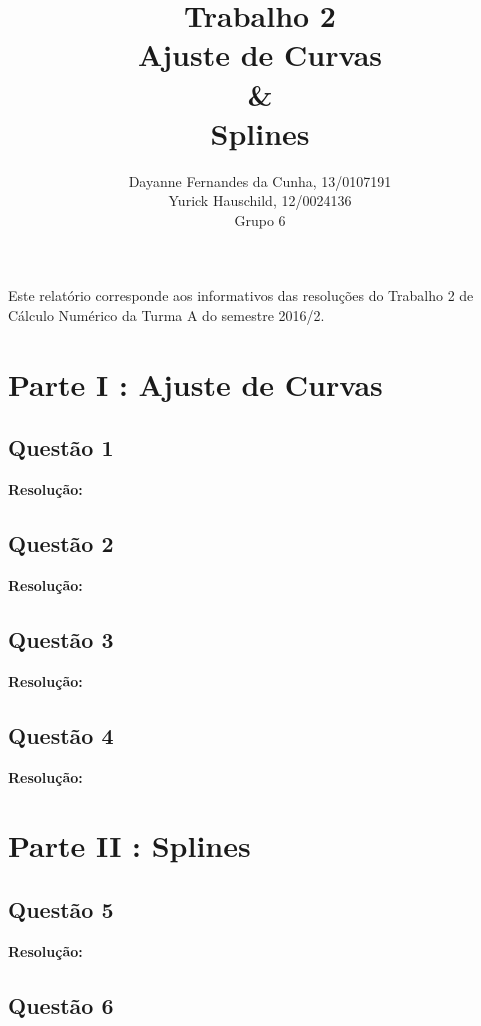 \documentclass[12pt]{article}
\title{Trabalho 2\\
Ajuste de Curvas\\
\& \\
Splines}
\author{Dayanne Fernandes da Cunha, 13/0107191\\
       Yurick Hauschild, 12/0024136\\
       Grupo 6
}
\begin{document}
\maketitle


 \begin{resumo}
 	Este relatório corresponde aos informativos das resoluções do Trabalho 2 de Cálculo Numérico da Turma A do semestre 2016/2.
 \end{resumo}

\section{Parte I : Ajuste de Curvas}
\label{sec:parte1}

\subsection{Questão 1}
\label{subsec:p1q1}

\textbf{Resolução:}


\subsection{Questão 2}
\label{subsec:p1q2}

\textbf{Resolução:}

\subsection{Questão 3}
\label{subsec:p1q3}

\textbf{Resolução:}

\subsection{Questão 4}
\label{subsec:p1q4}

\textbf{Resolução:} 

\section{Parte II : Splines}
\label{sec:parte2}

\subsection{Questão 5}
\label{subsec:p2q5}

\textbf{Resolução:}

\subsection{Questão 6}
\label{subsec:p2q6}
\end{document}
